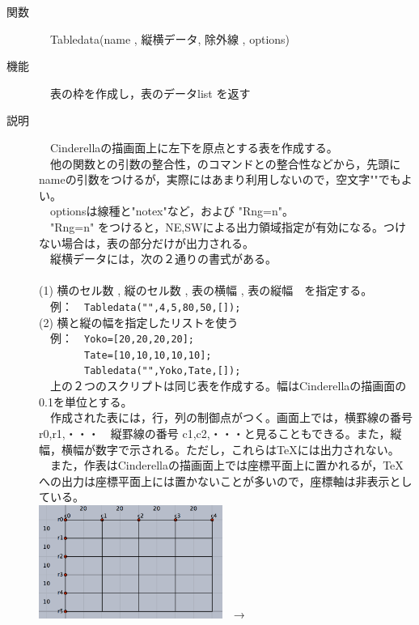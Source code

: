 \documentclass[papersize,a4paper,12pt,uplatex]{jsarticle}
\begin{document}
\begin{description}

\hypertarget{tabledata}{}
\item[関数]　Tabledata(name , 縦横データ, 除外線 , options)
\item[機能]　表の枠を作成し，表のデータlist を返す
\item[説明]　Cinderellaの描画面上に左下を原点とする表を作成する。\\
　他の関数との引数の整合性，\ketpic のコマンドとの整合性などから，先頭にnameの引数をつけるが，実際にはあまり利用しないので，空文字""でもよい。\\
　optionsは線種と"notex"など，および "Rng=n"。\\
　"Rng=n" をつけると，NE,SWによる出力領域指定が有効になる。つけない場合は，表の部分だけが出力される。\\
　縦横データには，次の２通りの書式がある。\\
　\\
(1) 横のセル数 , 縦のセル数 , 表の横幅 , 表の縦幅　を指定する。\\
　例：　\verb|Tabledata("",4,5,80,50,[]);|\\
(2) 横と縦の幅を指定したリストを使う\\
　例：　\verb|Yoko=[20,20,20,20];|\\
　　　　\verb|Tate=[10,10,10,10,10];|\\
　　　　\verb|Tabledata("",Yoko,Tate,[]);|\\
　上の２つのスクリプトは同じ表を作成する。幅はCinderellaの描画面の0.1を単位とする。\\
　作成された表には，行，列の制御点がつく。画面上では，横罫線の番号 r0,r1,・・・　縦罫線の番号 c1,c2,・・・と見ることもできる。また，縦幅，横幅が数字で示される。ただし，これらは\TeX には出力されない。\\
　また，作表はCinderellaの描画面上では座標平面上に置かれるが，\TeX への出力は座標平面上には置かないことが多いので，座標軸は非表示としている。\\

\includegraphics[bb=0 0 807 499 , width=6cm]{Fig/table01.png}　→　
\\


\end{description}
\end{document}
